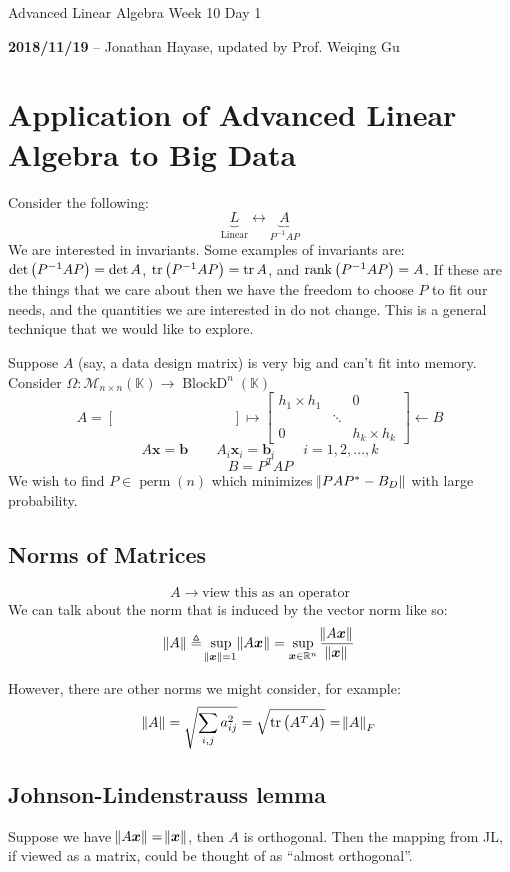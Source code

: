 \documentclass{article}
\DeclareMathOperator{\trace}{tr}
\DeclareMathOperator{\rank}{rank}
\newcommand{\m}[1]{\begin{bmatrix} #1 \end{bmatrix}}
\newcommand{\RR}{\mathbb{R}}
\begin{document}
\begin{center}
  \Large Advanced Linear Algebra Week 10 Day 1
  \normalsize

  \textbf{2018/11/19} -- Jonathan Hayase, updated by Prof. Weiqing Gu
\end{center}

\section{Application of Advanced Linear Algebra to Big Data}
Consider the following:
\[\underbrace{L}_{\text{Linear}} \longleftrightarrow \underbrace{A}_{P^{-1}AP}\]
We are interested in invariants.
Some examples of invariants are: \(\det \del{P^{-1}AP} = \det A\), \(\trace \del{P^{-1}AP} = \trace A\), and \(\rank \del{P^{-1}AP} = A\).
If these are the things that we care about then we have the freedom to choose \(P\) to fit our needs, and the quantities we are interested in do not change.
This is a general technique that we would like to explore.

Suppose \(A\) (say, a data design matrix) is very big and can't fit into memory.
Consider \(\Omega:\mathcal M_{n \times n}(\mathbb{K}) \to \mathop{\mathrm{BlockD}}^n(\mathbb K)\)
\[A = \m{\qquad & \qquad & \qquad \\ \qquad & \qquad & \qquad} \mapsto \m{\boxed{h_1\times h_1} & & 0\\ &\ddots\\0 & & \boxed{h_k\times h_k}} \leftarrow B\]
\[A\bm x = \bm b\qquad A_i\bm x_i = \bm b_i\qquad i=1,2,\dots,k\]
\[B = P^TAP\]
We wish to find \(P \in \mathop{\mathrm{perm}}(n)\) which minimizes \(\norm{PAP^* - B_D}\) with large probability.

\subsection{Norms of Matrices}
\[A \to \text{view this as an operator}\]
We can talk about the norm that is induced by the vector norm like so:
\[\norm{A}\triangleq \sup_{\norm{\bm x} = 1} \norm{A\bm x} = \sup_{\bm x \in \RR^n} \frac{\norm{A\bm x}}{\norm{\bm x}}\]

However, there are other norms we might consider, for example:
\[\norm A = \sqrt{\sum_{i, j} a_{ij}^2} = \sqrt{\trace \del{A^TA}} = \norm{A}_F\]

\subsection{Johnson-Lindenstrauss lemma}
Suppose we have \(\norm{A\bm x} = \norm{\bm x}\), then \(A\) is orthogonal.
Then the mapping from JL, if viewed as a matrix, could be thought of as ``almost orthogonal''.
\end{document}
